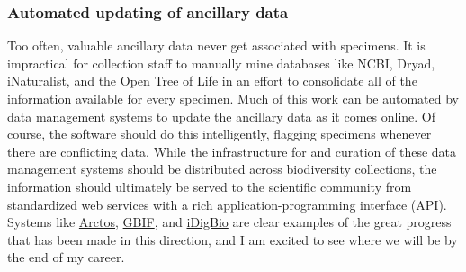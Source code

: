 \documentclass[10pt]{article}
\begin{document}
\subsubsection*{Automated updating of ancillary data}
Too often, valuable ancillary data never get associated with specimens.
It is impractical for collection staff to manually mine databases like NCBI,
Dryad, iNaturalist, and the Open Tree of Life in an effort to consolidate all
of the information available for every specimen.
Much of this work can be automated by data management systems to update the
ancillary data as it comes online.
Of course, the software should do this intelligently, flagging specimens
whenever there are conflicting data.
While the infrastructure for and curation of these data management systems
should be distributed across biodiversity collections, the information should
ultimately be served to the scientific community from standardized
web services with a rich application-programming interface (API).
Systems like
\href{https://arctosdb.org/}{Arctos},
\href{https://www.gbif.org/}{GBIF},
and
\href{https://www.idigbio.org/}{iDigBio}
are clear examples of the great progress that has been made in this direction,
and I am excited to see where we will be by the end of my career.




\end{document}
